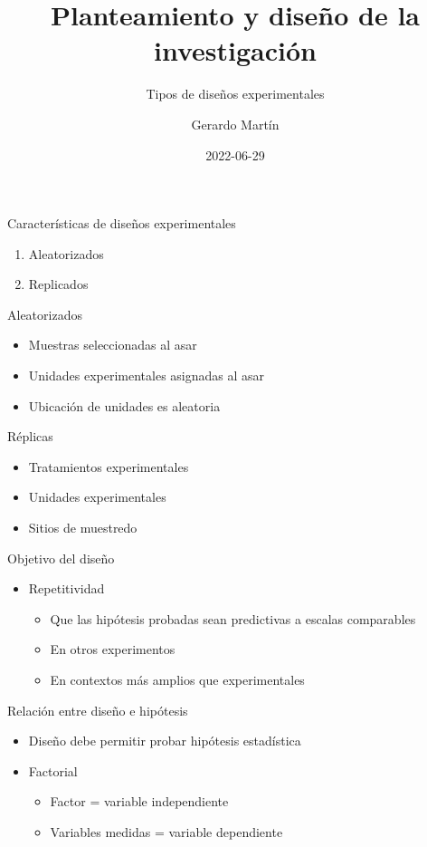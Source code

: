 \documentclass[
  11pt,
  ignorenonframetext,
]{beamer}
\title{Planteamiento y diseño de la investigación}
\subtitle{Tipos de diseños experimentales}
\author{Gerardo Martín}
\date{2022-06-29}
\begin{document}
\frame{\titlepage}

\begin{frame}{Características de diseños experimentales}
\protect\hypertarget{caracteruxedsticas-de-diseuxf1os-experimentales}{}
\begin{enumerate}
\item
  Aleatorizados
\item
  Replicados
\end{enumerate}
\end{frame}

\begin{frame}{Aleatorizados}
\protect\hypertarget{aleatorizados}{}
\begin{itemize}
\item
  Muestras seleccionadas al asar
\item
  Unidades experimentales asignadas al asar
\item
  Ubicación de unidades es aleatoria
\end{itemize}
\end{frame}

\begin{frame}{Réplicas}
\protect\hypertarget{ruxe9plicas}{}
\begin{itemize}
\item
  Tratamientos experimentales
\item
  Unidades experimentales
\item
  Sitios de muestredo
\end{itemize}
\end{frame}

\begin{frame}{Objetivo del diseño}
\protect\hypertarget{objetivo-del-diseuxf1o}{}
\begin{itemize}
\item
  Repetitividad

  \begin{itemize}
  \item
    Que las hipótesis probadas sean predictivas a escalas comparables
  \item
    En otros experimentos
  \item
    En contextos más amplios que experimentales
  \end{itemize}
\end{itemize}
\end{frame}

\begin{frame}{Relación entre diseño e hipótesis}
\protect\hypertarget{relaciuxf3n-entre-diseuxf1o-e-hipuxf3tesis}{}
\begin{itemize}
\item
  Diseño debe permitir probar hipótesis estadística
\item
  Factorial

  \begin{itemize}
  \item
    Factor = variable independiente
  \item
    Variables medidas = variable dependiente
  \end{itemize}
\end{itemize}
\end{frame}
\end{document}
